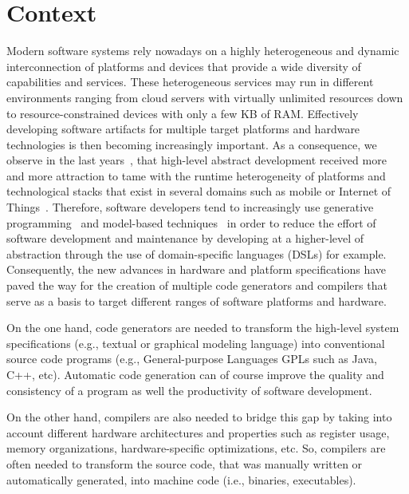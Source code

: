 

\section{Context}
Modern software systems rely nowadays on a highly heterogeneous and dynamic interconnection of platforms and devices that provide a wide diversity of capabilities and services. These heterogeneous services may run in different environments ranging from cloud servers with virtually unlimited resources down to resource-constrained devices with only a few KB of RAM. Effectively developing software artifacts for multiple target platforms and hardware technologies is then becoming increasingly important. As a consequence, we observe in the last years~\cite{Czarnecki:2000:GPM:345203}, that high-level abstract development received more and more attraction to tame with the runtime heterogeneity of platforms and technological stacks that exist in several domains such as mobile or Internet of Things~\cite{betz2011improving}.
Therefore, software developers tend to increasingly use generative programming~\cite{Czarnecki:2000:GPM:345203} and model-based techniques~\cite{france2007model} in order to reduce the effort of software development and maintenance by developing at a higher-level of abstraction through the use of domain-specific languages (DSLs) for example. 
Consequently, the new advances in hardware and platform specifications have paved the way for the creation of multiple code generators and compilers that serve as a basis to target different ranges of software platforms and hardware. 

On the one hand, code generators are needed to transform the high-level system specifications (e.g., textual or graphical modeling language) into conventional source code programs (e.g., General-purpose Languages GPLs such as Java, C++, etc). Automatic code generation can of course improve the quality and consistency of a program as well the productivity of software development.

On the other hand, compilers are also needed to bridge this gap by taking into account different hardware architectures and properties such as register usage, memory organizations, hardware-specific optimizations, etc. So, compilers are often needed to transform the source code, that was manually written or automatically generated, into machine code (i.e., binaries, executables). 

